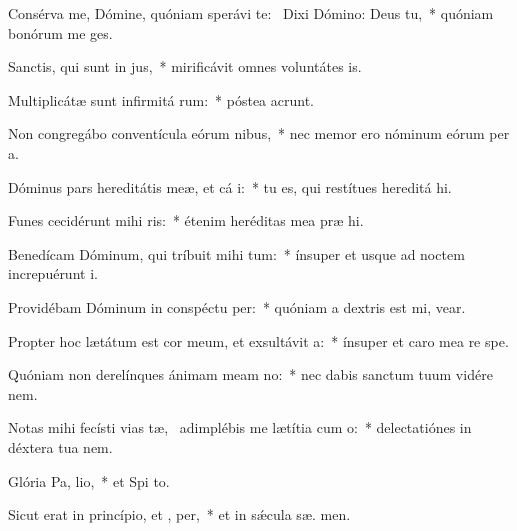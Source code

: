 \item Consérva me, Dómine, quóniam sperávi  te:~\pscross{} Dixi Dómino: Deus   tu,~* quóniam bonórum me  ges.
\item Sanctis, qui sunt in  jus,~* mirificávit omnes voluntátes   is.
\item Multiplicátæ sunt infirmitá rum:~* póstea acrunt.
\item Non congregábo conventícula eórum  nibus,~* nec memor ero nóminum eórum per  a.
\item Dóminus pars hereditátis meæ, et cá i:~* tu es, qui restítues hereditá  hi.
\item Funes cecidérunt mihi  ris:~* étenim heréditas mea præ  hi.
\item Benedícam Dóminum, qui tríbuit mihi tum:~* ínsuper et usque ad noctem increpuérunt   i.
\item Providébam Dóminum in conspéctu  per:~* quóniam a dextris est mi,  vear.
\item Propter hoc lætátum est cor meum, et exsultávit  a:~* ínsuper et caro mea re  spe.
\item Quóniam non derelínques ánimam meam  no:~* nec dabis sanctum tuum vidére nem.
\item Notas mihi fecísti vias tæ,~\pscross{} adimplébis me lætítia cum  o:~* delectatiónes in déxtera tua   nem.
\item Glória Pa,  lio,~* et Spi to.
\item Sicut erat in princípio, et ,  per,~* et in sǽcula sæ. men.

